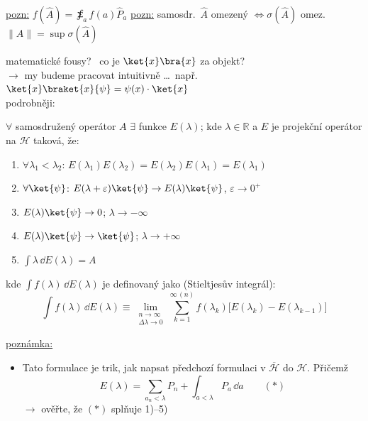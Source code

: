 \underline{pozn:} \quad $f(\hat A) = \sumint_a f(a)\hat P_a$ \qquad
\underline{pozn:} samosdr.\ $\hat A$ omezený $\Leftrightarrow\sigma(\hat A)$ omez. \quad $\|\hat A\| = \sup\sigma(\hat A)$

matematické fousy? \ co je $\ket{x}\bra{x}$ za objekt? \\
$\to$ my budeme pracovat intuitivně \dots\ např.\ $\ket{x}\braket{x}{\psi} = \psi(x)\cdot\ket{x}$ \\
podrobněji:

\begin{veta}
$\forall$ samosdružený operátor $A$ $\exists$ funkce $E(\lambda)$; kde $\lambda\in\mathbb{R}$ a $E$ je projekční operátor na $\mathcal{H}$ taková, že:
\begin{enumerate}[label=\arabic*),nosep]
  \item $\forall\lambda_1 < \lambda_2$: \quad $E(\lambda_1)E(\lambda_2) = E(\lambda_2)E(\lambda_1) = E(\lambda_1)$
  \item $\forall\ket{\psi}$: \quad $E(\lambda+\varepsilon)\ket{\psi}\to E(\lambda)\ket{\psi}$, \quad $\varepsilon\to 0^+$
  \item \phantom{$\forall\ket{\psi}$:} \quad $E(\lambda)\ket{\psi}\to 0$; \quad $\lambda\to -\infty$
  \item \phantom{$\forall\ket{\psi}$:} \quad $E(\lambda)\ket{\psi}\to\ket{\psi}$; \quad $\lambda\to +\infty$
  \item $\int\lambda\,\dd E(\lambda) = A$
\end{enumerate}
\end{veta}
kde $\int f(\lambda)\,\dd E(\lambda)$ je definovaný jako (Stieltjesův integrál):
\[
  \int f(\lambda)\,\dd E(\lambda) \equiv \lim_{\substack{n\to\infty\\ \Delta\lambda\to 0}}\sum_{k=1}^{\infty\,(n)} f(\lambda_k)\big[E(\lambda_k) - E(\lambda_{k-1})\big]
\]

\underline{poznámka:}
\begin{itemize}
  \item Tato formulace je trik, jak napsat předchozí formulaci v $\overline{\mathcal{H}}$ do $\mathcal{H}$. Přičemž
  \[ E(\lambda) = \sum_{a_n<\lambda}P_n + \int_{a<\lambda}P_a\,\dd a \qquad (*) \]
  $\to$ ověřte, že $(*)$ splňuje 1)--5)
\end{itemize}


